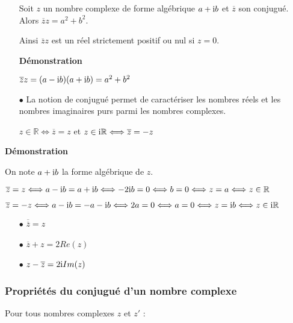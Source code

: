 \begin{corollary}
\begin{itemize}
\item[\bullet]
Soit $ z $ un nombre complexe de forme algébrique  $ a+ \text{i} b$ et $ \overline{z} $ son conjugué. Alors $ \overline{z} z=a^2+b^2 $.


\medskip

Ainsi $  \overline{z} z $  est un réel strictement positif ou nul si $ z=0 $.
\medskip

\textbf{Démonstration}

\medskip

$ \overline{z} z= (a- \text{i} b)(a+ \text{i} b) =a^2+b^2 $


\medskip
\item[$  \bullet$] La notion de conjugué permet de caractériser les  nombres réels et les nombres imaginaires purs parmi les nombres complexes.

\medskip
\hspace*{2cm} $ z\in\mathbb{R} \Longleftrightarrow \overline{z} =z $
\quad et \quad  $ z\in\text{i}\mathbb{R} \Longleftrightarrow \overline{z} =-z $

\end{itemize}
\end{corollary}
\textbf{Démonstration}

\medskip

On note $ a+ \text{i} b$ la forme algébrique de $ z $.


\medskip
 $ \overline{z} =z \Longleftrightarrow a- \text{i} b =a+ \text{i} b \Longleftrightarrow -2\text{i} b=0 \Longleftrightarrow b=0 \Longleftrightarrow z=a \Longleftrightarrow z\in\mathbb{R} $


\medskip
 $ \overline{z} =-z \Longleftrightarrow a- \text{i} b =-a- \text{i} b \Longleftrightarrow 2a=0 \Longleftrightarrow a=0 \Longleftrightarrow z=\text{i} b \Longleftrightarrow z\in\text{i}\mathbb{R} $


\medskip

\begin{remark}
\begin{itemize}
\item[$  \bullet$] $ \overline{\overline{z}}=z $
\item[$  \bullet$] $ \overline{z} +z=2 Re(z)$
\item[$  \bullet$] $ z-\overline{z} =2 \text{i} Im(z)$
\end{itemize}

\end{remark}
\subsubsection*{Propriétés du conjugué d'un nombre complexe}
Pour tous nombres complexes $z $ et $z' $ :

